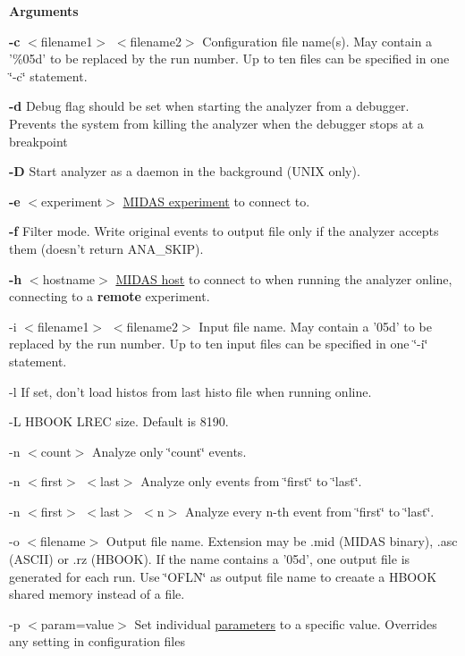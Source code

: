 \begin{DoxyItemize}
\item {\bfseries  Arguments }
\begin{DoxyItemize}
\item {\bfseries -\/c} $<$filename1$>$ $<$filename2$>$ Configuration file name(s). May contain a '\%05d' to be replaced by the run number. Up to ten files can be specified in one \char`\"{}-\/c\char`\"{} statement.
\item {\bfseries -\/d} Debug flag should be set when starting the analyzer from a debugger. Prevents the system from killing the analyzer when the debugger stops at a breakpoint
\item {\bfseries -\/D} Start analyzer as a daemon in the background (UNIX only).
\item {\bfseries -\/e} $<$experiment$>$ \hyperlink{F_Utilities_List_F_utilities_params}{MIDAS experiment} to connect to.
\item {\bfseries -\/f} Filter mode. Write original events to output file only if the analyzer accepts them (doesn't return ANA\_\-SKIP).
\item {\bfseries -\/h} $<$hostname$>$ \hyperlink{F_Utilities_List_F_utilities_params}{MIDAS host} to connect to when running the analyzer online, connecting to a {\bfseries remote} experiment.
\item -\/i $<$filename1$>$ $<$filename2$>$ Input file name. May contain a '05d' to be replaced by the run number. Up to ten input files can be specified in one \char`\"{}-\/i\char`\"{} statement.
\item -\/l If set, don't load histos from last histo file when running online.
\item -\/L HBOOK LREC size. Default is 8190.
\item -\/n $<$count$>$ Analyze only \char`\"{}count\char`\"{} events.
\item -\/n $<$first$>$ $<$last$>$ Analyze only events from \char`\"{}first\char`\"{} to \char`\"{}last\char`\"{}.
\item -\/n $<$first$>$ $<$last$>$ $<$n$>$ Analyze every n-\/th event from \char`\"{}first\char`\"{} to \char`\"{}last\char`\"{}.
\item -\/o $<$filename$>$ Output file name. Extension may be .mid (MIDAS binary), .asc (ASCII) or .rz (HBOOK). If the name contains a '05d', one output file is generated for each run. Use \char`\"{}OFLN\char`\"{} as output file name to creaate a HBOOK shared memory instead of a file.
\item -\/p $<$param=value$>$ Set individual \hyperlink{structparameters}{parameters} to a specific value. Overrides any setting in configuration files

\end{DoxyItemize}
\end{DoxyItemize}
